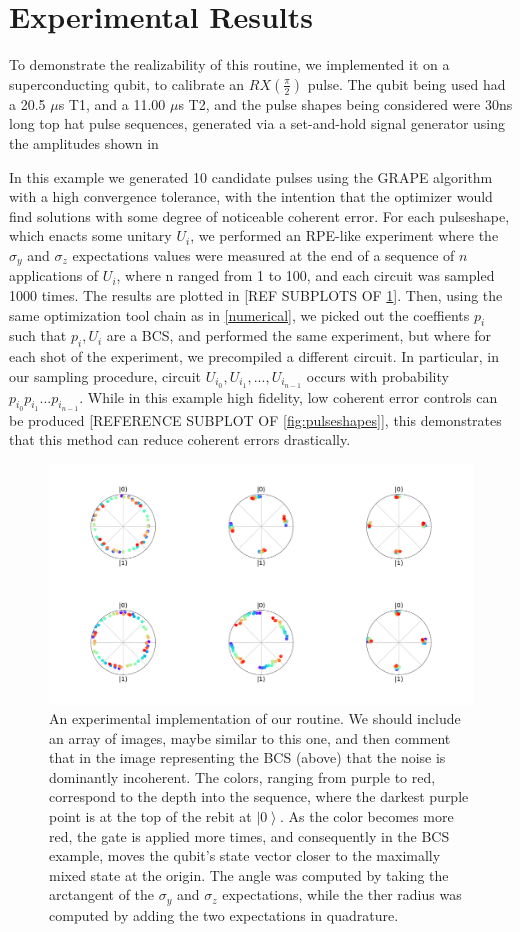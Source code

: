 \documentclass[aps,nofootinbib,pra,notitlepage,twocolumn]{revtex4-1}
\newcommand{\ket}[1]{\ensuremath{\left\vert{#1}\right\rangle}}
\begin{document}
\section{Experimental Results}\label{experimental}
To demonstrate the realizability of this routine, we implemented it on a superconducting qubit, to calibrate an $RX(\frac{\pi}{2})$ pulse. The qubit being used had a 20.5 $\mu$s T1, and a 11.00 $\mu$s T2, and the pulse shapes being considered were 30ns long top hat pulse sequences, generated via a set-and-hold signal generator using the amplitudes shown in 

In this example we generated 10 candidate pulses using the GRAPE algorithm with a high convergence tolerance, with the intention that the optimizer would find solutions with some degree of noticeable coherent error. For each pulseshape, which enacts some unitary $U_i$, we performed an RPE-like experiment\cite{Kimmel2015} where the $\sigma_y$ and $\sigma_z$ expectations values were measured at the end of a sequence of $n$ applications of $U_i$, where n ranged from 1 to 100, and each circuit was sampled 1000 times. The results are plotted in [REF SUBPLOTS OF \ref{fig:rebit}]. Then, using the same optimization tool chain as in \ref{numerical}, we picked out the coeffients $p_i$ such that $p_i, U_i$ are a BCS, and performed the same experiment, but where for each shot of the experiment, we precompiled a different circuit. In particular, in our sampling procedure, circuit $U_{i_0}, U_{i_1}, ..., U_{i_{n-1}}$ occurs with probability $p_{i_0}p_{i_1}...p_{i_{n-1}}$. While in this example high fidelity, low coherent error controls can be produced [REFERENCE SUBPLOT OF \ref{fig:pulseshapes}], this demonstrates that this method can reduce coherent errors drastically.

\begin{figure}[H]
  \centering
  \includegraphics[width=.75\columnwidth]{example.png}
  \caption{An experimental implementation of our routine. We should include an array of images, maybe similar to this one, and then comment that in the image representing the BCS (above) that the noise is dominantly incoherent. The colors, ranging from purple to red, correspond to the depth into the sequence, where the darkest purple point is at the top of the rebit at $\ket{0}$. As the color becomes more red, the gate is applied more times, and consequently in the BCS example, moves the qubit's state vector closer to the maximally mixed state at the origin. The angle was computed by taking the arctangent of the $\sigma_y$ and $\sigma_z$ expectations, while the ther radius was computed by adding the two expectations in quadrature.}
  \label{fig:rebit}
\end{figure}
\end{document}
